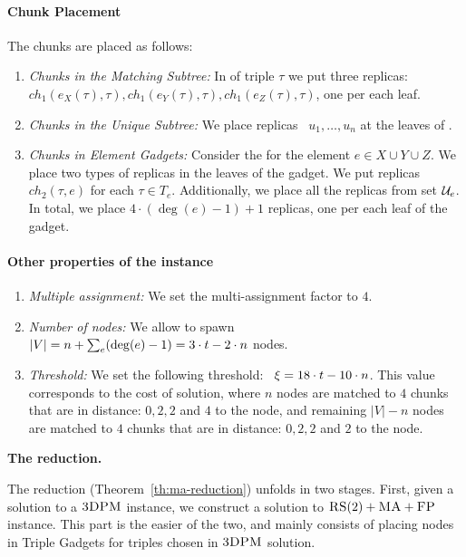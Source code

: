 \paragraph{Chunk Placement}
The chunks are placed as follows:
\begin{enumerate}
  \item \emph{Chunks in the Matching Subtree:} In {\TripleGadget} of triple $\tau$ we put
  three replicas:
 ~$ch_1(e_X(\tau), \tau), ch_1(e_Y(\tau), \tau), ch_1(e_Z(\tau), \tau)$, one per each leaf.
  \item \emph{Chunks in the Unique Subtree:} We place replicas
 ~$u_1,\ldots, u_n$ at the leaves of \UnqGadgets.
 \item \emph{Chunks in Element Gadgets:} Consider the \ElGadget{} for the element $e \in X\cup Y\cup Z$.
 We place two types of replicas in the leaves of the gadget.
 We put replicas $ch_2(\tau, e)$ for each $\tau \in T_e$.
 Additionally, we place all the replicas from set ${\mathcal{U}_e}$.
 In total, we place $4\cdot (\deg(e) - 1) + 1$ replicas, one per each leaf of the gadget.
\end{enumerate}

\paragraph{Other properties of the instance}
\begin{enumerate}
  \item \emph{Multiple assignment:} We set the multi-assignment factor to $4$.
  \item \emph{Number of nodes:} We allow to spawn
 ~$|V| = n + \sum_{e}(\deg(e)-1) = 3\cdot t - 2\cdot n$ nodes.
 \item \emph{Threshold:} We set the following threshold:
 ~$\xi = 18\cdot t - 10\cdot n$.
 This value corresponds to the cost of solution, where $n$ nodes are matched to $4$ chunks that are in distance: $0, 2, 2$ and $4$ to the node, and remaining $|V|-n$ nodes are matched to $4$ chunks that are in distance: $0, 2, 2$ and $2$ to the node.
\end{enumerate}

\textbf{The reduction.}

The reduction (Theorem~\ref{th:ma-reduction}) unfolds in two stages.
First, given a solution to a $\textsc{3DPM}$ instance, we construct a solution to $\textsc{RS}(2)+\textsc{MA}+\textsc{FP}$ instance.
This part is the easier of the two, and mainly consists of placing nodes in Triple Gadgets for triples chosen in $\textsc{3DPM}$ solution.

